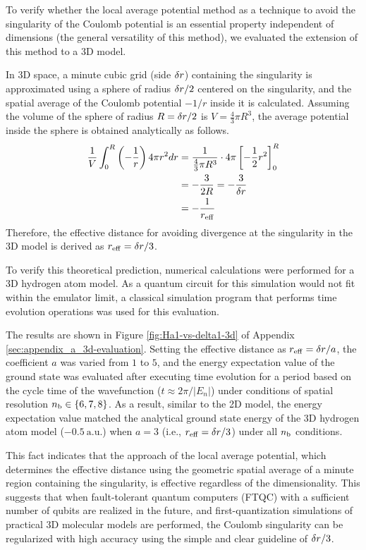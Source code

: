 \documentclass[aip-draft.tex]{subfiles}
\begin{document}
To verify whether the local average potential method as a technique to avoid the
singularity of the Coulomb potential is an essential property independent of
dimensions (the general versatility of this method), we evaluated the extension
of this method to a 3D model.

In 3D space, a minute cubic grid (side $\delta r$) containing the singularity is
approximated using a sphere of radius $\delta r/2$ centered on the singularity,
and the spatial average of the Coulomb potential $-1/r$ inside it is calculated.
Assuming the volume of the sphere of radius $R = \delta r/2$ is $V =
\frac{4}{3}\pi R^3$, the average potential inside the sphere is obtained
analytically as follows.
\begin{align}
    \frac{1}{V} \int_{0}^{R} \left(-\frac{1}{r}\right) 4\pi r^2 dr 
    &= \frac{1}{\frac{4}{3}\pi R^3} \cdot 4\pi
      \left[ -\frac{1}{2}r^2 \right]_{0}^{R} \\
    &= -\frac{3}{2R} = -\frac{3}{\delta r} \notag \\
    &= -\frac{1}{r_{\mathrm{eff}}}
\end{align}
Therefore, the effective distance for avoiding divergence at the singularity in
the 3D model is derived as $r_{\mathrm{eff}} = \delta r/3$.

To verify this theoretical prediction, numerical calculations were performed for
a 3D hydrogen atom model. As a quantum circuit for this simulation would not
fit within the emulator limit, a classical simulation program that performs time
evolution operations was used for this evaluation.

The results are shown in Figure \ref{fig:Ha1-vs-delta1-3d} of Appendix
\ref{sec:appendix_a_3d-evaluation}. Setting the effective distance as
$r_{\mathrm{eff}} = \delta r/a$, the coefficient $a$ was varied from $1$ to $5$,
and the energy expectation value of the ground state was evaluated after
executing time evolution for a period based on the cycle time of the
wavefunction ($t\approx 2\pi/|E_n|$) under conditions of spatial resolution $n_{\mathrm{b}}
\in \{6, 7, 8\}$. As a result, similar to the 2D model, the energy expectation
value matched the analytical ground state energy of the 3D hydrogen atom model
($-0.5\ \mathrm{a.u.}$) when $a=3$ (i.e., $r_{\mathrm{eff}} = \delta r/3$) under
all $n_{\mathrm{b}}$ conditions.

This fact indicates that the approach of the local average potential, which
determines the effective distance using the geometric spatial average of a minute
region containing the singularity, is effective regardless of the
dimensionality. This suggests that when fault-tolerant quantum computers (FTQC)
with a sufficient number of qubits are realized in the future, and
first-quantization simulations of practical 3D molecular models are performed,
the Coulomb singularity can be regularized with high accuracy using the simple
and clear guideline of $\delta r/3$.
\end{document}
